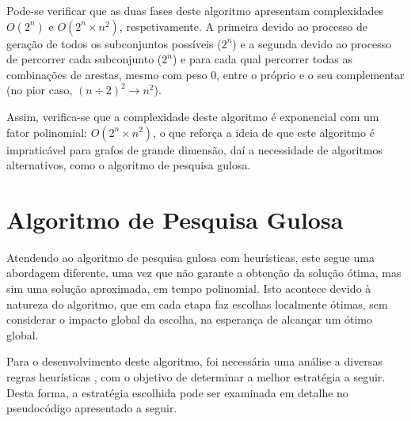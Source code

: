 \documentclass[mirror]{revdetua}
\begin{document}
Pode-se verificar que as duas fases deste algoritmo apresentam complexidades $O(2^n)$ e $O(2^n \times n^2)$, respetivamente. A primeira devido ao processo de geração de todos os subconjuntos possíveis ($2^n$) e a segunda devido ao processo de percorrer cada subconjunto ($2^n$) e para cada qual percorrer todas as combinações de arestas, mesmo com peso $0$, entre o próprio e o seu complementar (no pior caso, $(n \div 2)^2 \rightarrow n^2$).

Assim, verifica-se que a complexidade deste algoritmo é exponencial com um fator polinomial: $O(2^n \times n^2)$, o que reforça a ideia de que este algoritmo é impraticável para grafos de grande dimensão, daí a necessidade de algoritmos alternativos, como o algoritmo de pesquisa gulosa.


\section{Algoritmo de Pesquisa Gulosa}

Atendendo ao algoritmo de pesquisa gulosa com heurísticas, este segue uma abordagem diferente, uma vez que não garante a obtenção da solução ótima, mas sim uma solução aproximada, em tempo polinomial. Isto acontece devido à natureza do algoritmo, que em cada etapa faz escolhas localmente ótimas, sem considerar o impacto global da escolha, na esperança de alcançar um ótimo global.

Para o desenvolvimento deste algoritmo, foi necessária uma análise a diversas regras heurísticas \cite{WANG23}, com o objetivo de determinar a melhor estratégia a seguir. Desta forma, a estratégia escolhida pode ser examinada em detalhe no pseudocódigo apresentado a seguir.
\end{document}
